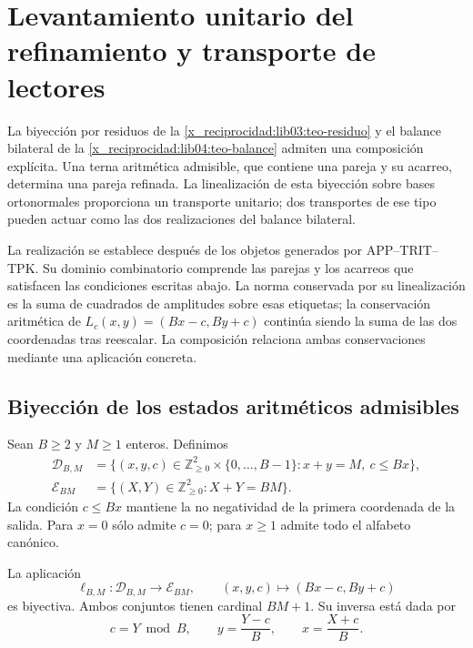 \chapter{Levantamiento unitario del refinamiento y transporte de lectores}
\label{x_reciprocidad:lib05:levantamiento}

La biyección por residuos de la \cref{x_reciprocidad:lib03:teo-residuo} y el
balance bilateral de la \cref{x_reciprocidad:lib04:teo-balance} admiten una
composición explícita. Una terna aritmética admisible, que contiene
una pareja y su acarreo, determina una pareja refinada. La
linealización de esta biyección sobre bases ortonormales proporciona
un transporte unitario; dos transportes de ese tipo pueden actuar
como las dos realizaciones del balance bilateral.

La realización se establece después de los objetos generados por
APP--TRIT--TPK. Su dominio combinatorio comprende las parejas y los
acarreos que satisfacen las condiciones escritas abajo. La norma
conservada por su linealización es la suma de cuadrados de amplitudes
sobre esas etiquetas; la conservación aritmética de
\(L_c(x,y)=(Bx-c,By+c)\) continúa siendo la suma de las dos
coordenadas tras reescalar. La composición relaciona ambas
conservaciones mediante una aplicación concreta.

\section{Biyección de los estados aritméticos admisibles}
\label{x_reciprocidad:lib05:biyeccion}

Sean \(B\geq2\) y \(M\geq1\) enteros. Definimos
\begin{align}
 \mathcal D_{B,M}
 &=\bigl\{(x,y,c)\in\mathbb Z_{\geq0}^2
                 \times\{0,\ldots,B-1\}:x+y=M,\ c\leq Bx\bigr\},
 \label{x_reciprocidad:lib05:dominio}\\
 \mathcal E_{BM}
 &=\bigl\{(X,Y)\in\mathbb Z_{\geq0}^2:X+Y=BM\bigr\}.
 \label{x_reciprocidad:lib05:codominio}
\end{align}
La condición \(c\leq Bx\) mantiene la no negatividad de la
primera coordenada de la salida. Para \(x=0\) sólo admite
\(c=0\); para \(x\geq1\) admite todo el alfabeto canónico.

\begin{theorem}
\label{x_reciprocidad:lib05:teo-biyeccion}
La aplicación
\begin{equation}
 \ell_{B,M}:\mathcal D_{B,M}\longrightarrow\mathcal E_{BM},
 \qquad (x,y,c)\longmapsto(Bx-c,By+c)
 \label{x_reciprocidad:lib05:mapa-etiquetas}
\end{equation}
es biyectiva. Ambos conjuntos tienen cardinal \(BM+1\). Su inversa
está dada por
\begin{equation}
 c=Y\bmod B,\qquad y=\frac{Y-c}{B},\qquad x=\frac{X+c}{B}.
 \label{x_reciprocidad:lib05:inversa-etiquetas}
\end{equation}
\end{theorem}

